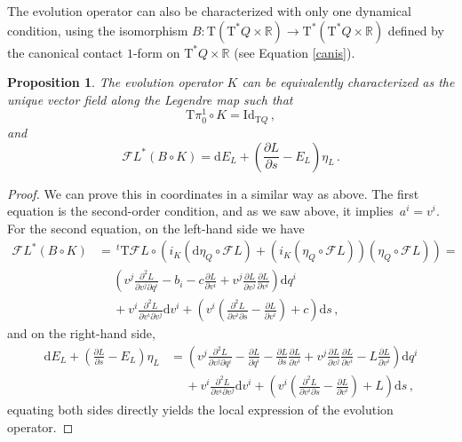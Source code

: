 \documentclass[11pt]{article}
\theoremstyle{plain}
\newtheorem{proposition}[theorem]{Proposition}
\theoremstyle{definition}
\newcommand{\R}{\mathbb{R}}
\renewcommand{\d}{\mathrm{d}}
\newcommand{\T}{{\mathrm T}}
\let\Tan\T
\newcommand{\parder}[2]{\frac{\partial #1}{\partial #2}}
\newcommand{\parderr}[3]{\frac{\partial^2 #1}{\partial #2\partial #3}}
\def\d{\mathrm{d}}
\def\d{\mathrm{d}}
\def\Tan{\mathrm{T}}
\def\FL{\mathcal{F} L}
\begin{document}
The evolution operator can also be characterized with only one dynamical condition, using the isomorphism $B\colon \Tan (\Tan ^* Q \times \R) \to \Tan^* (\Tan^* Q \times \R)$ defined by the canonical contact $1$-form on $\Tan^*Q\times \R$ (see Equation \eqref{canis}). 

\begin{proposition}
    The evolution operator $K$ can be equivalently characterized as the unique vector field along the Legendre map such that
    \begin{equation}
        \Tan \pi_0^1 \circ K = \mathrm{Id}_{\Tan Q} \,,
    \end{equation}
    and
    \begin{equation} \label{K_formula_def}
        \FL^*(B \circ K) = \d E_L + \left( \parder{L}{s} - E_L\right) \eta_L\,.
    \end{equation}
\end{proposition}
\begin{proof}
    We can prove this in coordinates in a similar way as above.
    The first equation is the second-order condition, and as we saw above, it implies~$a^i=v^i$.
    For the second equation, on the left-hand side we have
    \begin{align}
    \FL^*(B\circ K ) &= \,^t\Tan \FL \circ (i_K(\d\eta_Q\circ \FL) + (i_K(\eta_Q \circ \FL))(\eta_Q\circ \FL))=\\
    &\ \quad\left( v^j \parderr{L}{v^j}{q^i} - b_i - c\parder{L}{v^i}+ v^j\parder{L}{v^j}\parder{L}{v^i}\right)\d q^i\\
    &\ \quad + v^i\parderr{L}{v^i}{v^j}  \d v^i  
+\left( v^i \left( \parderr{L}{v^i}{s} - \parder{L}{v^i} \right) +c\right) \d s \,,
    \end{align}
    and on the right-hand side,
    \begin{align}
            \d E_L + \left(\parder{L}{s} - E_L\right) \eta_L &= 
            \left( v^j\parderr{L}{v^j}{q^i} - \parder{L}{q^i}- \parder{L}{s}\parder{L}{v^i} + v^j\parder{L}{v^j}\parder{L}{v^i} -L\parder{L}{v^i} \right) \d q^i\\ &\ \quad + v^i\parderr{L}{v^i}{v^j} \d v^i +\left( v^i \left( \parderr{L}{v^i}{s} - \parder{L}{v^i} \right)  + L \right) \d s  \,,
    \end{align}
    equating both sides directly yields the local expression of the evolution operator.
\end{proof}
\end{document}
